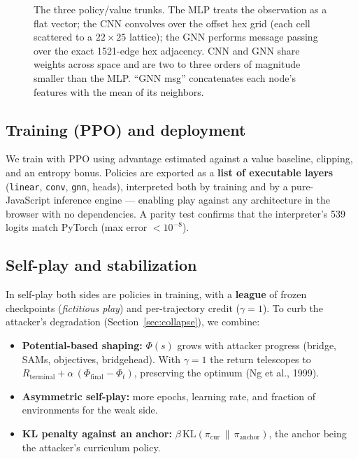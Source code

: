 \documentclass{article}
\begin{document}
\begin{figure}[t]
\caption{The three policy/value trunks. The MLP treats the observation as a flat vector;
the CNN convolves over the offset hex grid (each cell scattered to a $22{\times}25$
lattice); the GNN performs message passing over the exact 1521-edge hex adjacency. CNN
and GNN share weights across space and are two to three orders of magnitude smaller than
the MLP. ``GNN msg'' concatenates each node's features with the mean of its neighbors.}
\label{fig:nets}
\end{figure}

\subsection{Training (PPO) and deployment}
\label{sec:train}
We train with PPO using advantage estimated against a value baseline, clipping, and an
entropy bonus. Policies are exported as a \textbf{list of executable layers}
(\texttt{linear}, \texttt{conv}, \texttt{gnn}, heads), interpreted both by training and by
a pure-JavaScript inference engine --- enabling play against any architecture in the
browser with no dependencies. A parity test confirms that the interpreter's 539 logits
match PyTorch (max error $< 10^{-8}$).

\subsection{Self-play and stabilization}
In self-play both sides are policies in training, with a \textbf{league} of frozen
checkpoints (\emph{fictitious play}) and per-trajectory credit ($\gamma=1$). To curb the
attacker's degradation (Section~\ref{sec:collapse}), we combine:
\begin{itemize}[leftmargin=1.4em,itemsep=2pt]
  \item \textbf{Potential-based shaping:} $\Phi(s)$ grows with attacker progress (bridge,
  SAMs, objectives, bridgehead). With $\gamma=1$ the return telescopes to
  $R_{\text{terminal}} + \alpha\,(\Phi_{\text{final}} - \Phi_t)$, preserving the optimum
  (Ng et al., 1999).
  \item \textbf{Asymmetric self-play:} more epochs, learning rate, and fraction of
  environments for the weak side.
  \item \textbf{KL penalty against an anchor:} $\beta\,\mathrm{KL}(\pi_{\text{cur}}\,\|\,
  \pi_{\text{anchor}})$, the anchor being the attacker's curriculum policy.
\end{itemize}
\end{document}
